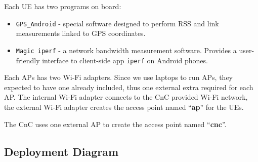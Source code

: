 Each UE has two programs on board:

\begin{itemize}
\tightlist
\item
  \texttt{GPS\_Android} - special software designed to perform RSS and
  link measurements linked to GPS coordinates.
\item
  \texttt{Magic\ iperf} - a network bandwidth measurement software.
  Provides a user-friendly interface to client-side app \texttt{iperf}
  on Android phones.
\end{itemize}

Each APs has two Wi-Fi adapters. Since we use laptops to run APs, they
expected to have one already included, thus one external extra required
for each AP. The internal Wi-Fi adapter connects to the CnC provided
Wi-Fi network, the external Wi-Fi adapter creates the access point named
``\textbf{ap}'' for the UEs.

The CnC uses one external AP to create the access point named
``\textbf{cnc}''.

\hypertarget{deployment-diagram}{%
\subsection{Deployment Diagram}\label{deployment-diagram}}

